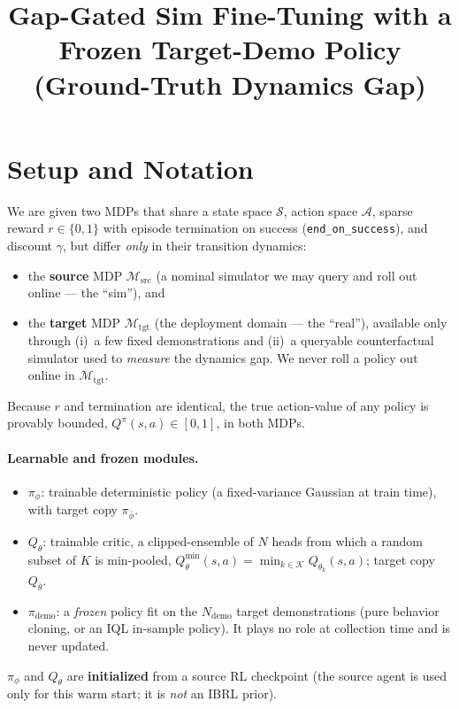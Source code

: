 \documentclass[11pt]{article}
\title{Gap-Gated Sim Fine-Tuning with a Frozen Target-Demo Policy\\
\large (Ground-Truth Dynamics Gap)}
\author{}
\date{}
\newcommand{\Msrc}{\mathcal{M}_{\mathrm{src}}}
\newcommand{\Mtgt}{\mathcal{M}_{\mathrm{tgt}}}
\newcommand{\pphi}{\pi_{\phi}}
\newcommand{\pdemo}{\pi_{\mathrm{demo}}}
\newcommand{\Qth}{Q_{\theta}}
\newcommand{\Qtt}{Q_{\bar{\theta}}}
\newcommand{\pbar}{\pi_{\bar{\phi}}}
\begin{document}
\maketitle

\section{Setup and Notation}

We are given two MDPs that share a state space $\mathcal{S}$, action space
$\mathcal{A}$, sparse reward $r\in\{0,1\}$ with episode termination on success
(\texttt{end\_on\_success}), and discount $\gamma$, but differ \emph{only} in
their transition dynamics:
\begin{itemize}
  \item the \textbf{source} MDP $\Msrc$ (a nominal simulator we may query and
        roll out online --- the ``sim''), and
  \item the \textbf{target} MDP $\Mtgt$ (the deployment domain --- the
        ``real''), available only through (i)~a few fixed demonstrations and
        (ii)~a queryable counterfactual simulator used to \emph{measure} the
        dynamics gap. We never roll a policy out online in $\Mtgt$.
\end{itemize}
Because $r$ and termination are identical, the true action-value of any policy
is provably bounded, $Q^{\pi}(s,a)\in[0,1]$, in both MDPs.

\paragraph{Learnable and frozen modules.}
\begin{itemize}
  \item $\pphi$: trainable deterministic policy (a fixed-variance Gaussian at
        train time), with target copy $\pbar$.
  \item $\Qth$: trainable critic, a clipped-ensemble of $N$ heads from which a
        random subset of $K$ is min-pooled, $\Qth^{\min}(s,a)=\min_{k\in
        \mathcal{K}}Q_{\theta_k}(s,a)$; target copy $\Qtt$.
  \item $\pdemo$: a \emph{frozen} policy fit on the $N_{\mathrm{demo}}$ target
        demonstrations (pure behavior cloning, or an IQL in-sample policy). It
        plays no role at collection time and is never updated.
\end{itemize}
$\pphi$ and $\Qth$ are \textbf{initialized} from a source RL checkpoint (the
source agent is used only for this warm start; it is \emph{not} an IBRL prior).
\end{document}
